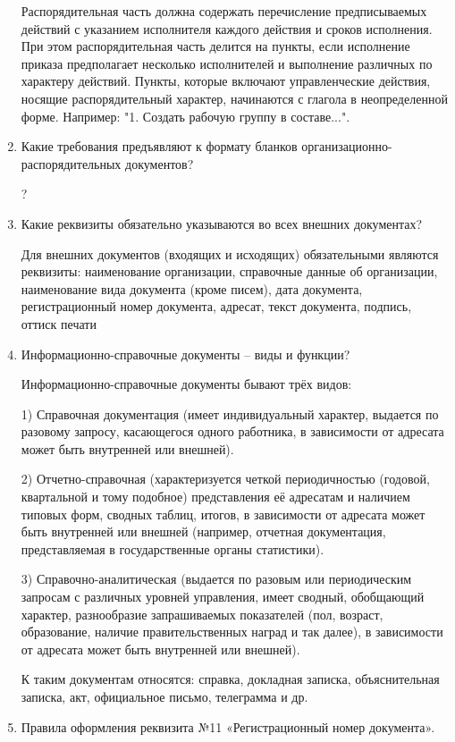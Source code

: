 \documentclass[a4paper,10pt]{article}
\theoremstyle{plain} %
\theoremstyle{definition} %
\theoremstyle{remark} %
\begin{document}
\begin{enumerate}
	Распорядительная часть должна содержать перечисление предписываемых действий с указанием исполнителя каждого действия и сроков исполнения. При этом распорядительная часть делится на пункты, если исполнение приказа предполагает несколько исполнителей и выполнение различных по характеру действий. Пункты, которые включают управленческие действия, носящие распорядительный характер, начинаются с глагола в неопределенной форме. Например: "1. Создать рабочую группу в составе...". 
	

	\item Какие требования предъявляют к формату бланков организационно-
распорядительных документов?

?

	\item Какие реквизиты обязательно указываются во всех внешних документах?
	
	Для внешних документов (входящих и исходящих) обязательными являются реквизиты: наименование организации, справочные данные об организации, наименование вида документа (кроме писем), дата документа, регистрационный номер документа, адресат, текст документа, подпись, оттиск печати

	\item Информационно-справочные документы – виды и функции?
	
	Информационно-справочные документы бывают трёх видов:
	
	1) Справочная документация (имеет индивидуальный характер, выдается по разовому запросу, касающегося одного работника, в зависимости от адресата может быть внутренней или внешней).
	
	2) Отчетно-справочная (характеризуется четкой периодичностью (годовой, квартальной и тому подобное) представления её адресатам и наличием типовых форм, сводных таблиц, итогов, в зависимости от адресата может быть внутренней или внешней (например, отчетная документация, представляемая в государственные органы статистики).
	
	3) Справочно-аналитическая (выдается по разовым или периодическим запросам с различных уровней управления, имеет сводный, обобщающий характер, разнообразие запрашиваемых показателей (пол, возраст, образование, наличие правительственных наград и так далее), в зависимости от адресата может быть внутренней или внешней).
	
	К таким документам относятся: справка, докладная записка, объяснительная записка, акт, официальное письмо, телеграмма и др.

	\item Правила оформления реквизита №11 «Регистрационный номер документа».
	

\end{enumerate}
\end{document}
